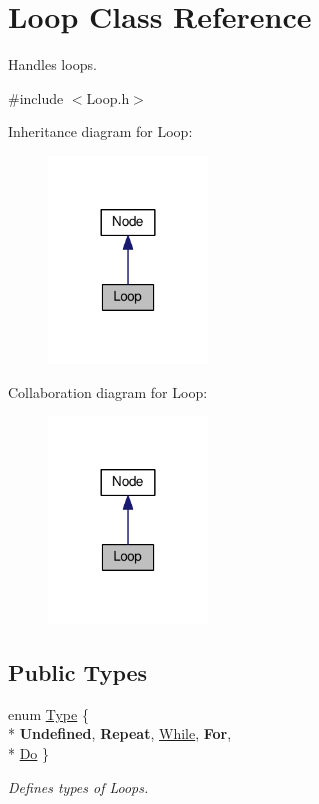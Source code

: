 \hypertarget{classLoop}{}\section{Loop Class Reference}
\label{classLoop}


Handles loops.  




{\ttfamily \#include $<$Loop.\+h$>$}



Inheritance diagram for Loop\+:\nopagebreak
\begin{figure}[H]
\begin{center}
\leavevmode
\includegraphics[width=120pt]{classLoop__inherit__graph}
\end{center}
\end{figure}


Collaboration diagram for Loop\+:\nopagebreak
\begin{figure}[H]
\begin{center}
\leavevmode
\includegraphics[width=120pt]{classLoop__coll__graph}
\end{center}
\end{figure}
\subsection*{Public Types}
\begin{DoxyCompactItemize}
\item 
enum \hyperlink{classLoop_af57e9c094063c514758dfe7bd986d6e7}{Type} \{ \\*
{\bfseries Undefined}, 
{\bfseries Repeat}, 
\hyperlink{classLoop_af57e9c094063c514758dfe7bd986d6e7a681be1f5a1ab60d13010c6df3358088e}{While}, 
{\bfseries For}, 
\\*
\hyperlink{classLoop_af57e9c094063c514758dfe7bd986d6e7a1dd9cd3dd842ae131b6f73ed04063cdd}{Do}
 \}
\begin{DoxyCompactList}\small\item\em Defines types of Loops. \end{DoxyCompactList}\end{DoxyCompactItemize}
